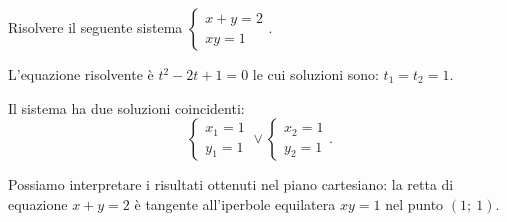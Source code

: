 \begin{esempio}
Risolvere il seguente sistema 
\(\left\{\begin{array}{l}{x+y=2}\\{xy=1}\end{array}\right.\).
\begin{multicols}{2}
L'equazione risolvente è \(t^2-2t+1=0\) le cui soluzioni sono: \(t_1=t_2=1\).

Il sistema ha due soluzioni coincidenti: \[ 
\left\{\begin{array}{l}{x_1=1}\\{y_1=1}\end{array}\right.\vee 
\left\{\begin{array}{l}{x_2=1}\\{y_2=1}\end{array}\right.. \]

Possiamo interpretare i risultati ottenuti nel piano cartesiano: la retta di 
equazione \(x+y=2\) è tangente all'iperbole equilatera \(xy=1\) nel punto 
\((1;~1)\).
\begin{center}

\end{center}
\end{multicols}
\end{esempio}
% 
% 
% 
% 
